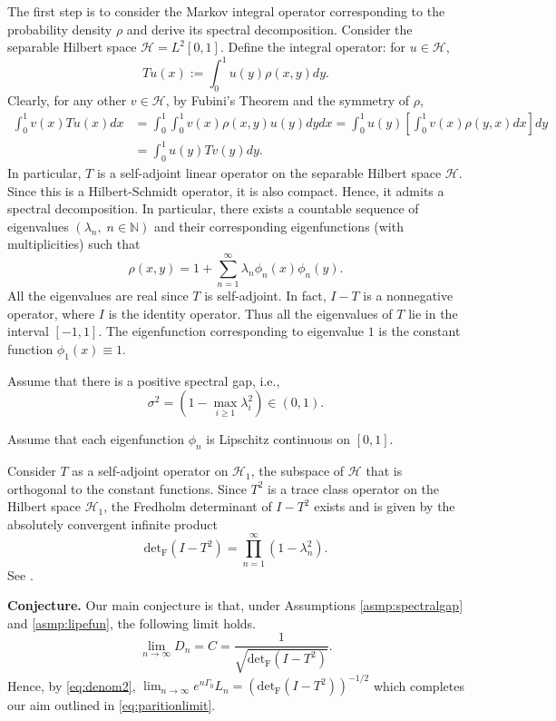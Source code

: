 \documentclass{amsart}
\newcommand{\NN}{\mathbb{N}}
\newcommand{\Hil}{\mathcal{H}}
\newcommand{\Fdet}{\mathrm{det}_{\mathrm{F}}}
\begin{document}
The first step is to consider the Markov integral operator corresponding to the probability density $\rho$ and derive its spectral decomposition. Consider the separable Hilbert space $\Hil=L^2[0,1]$. Define the integral operator: for $u \in \Hil$, 
\[
Tu(x):= \int_0^1 u(y) \rho(x,y)dy.  
\]
Clearly, for any other $v\in \Hil$, by Fubini's Theorem and the symmetry of $\rho$, 
\[
\begin{split}
\int_0^1 v(x) Tu(x) dx &= \int_0^1 \int_0^1 v(x) \rho(x,y) u(y) dy dx= \int_0^1 u(y) \left[ \int_0^1 v(x) \rho(y,x) dx \right] dy\\
&= \int_0^1 u(y) Tv(y) dy. 
\end{split}
\]
In particular, $T$ is a self-adjoint linear operator on the separable Hilbert space $\Hil$. Since this is a Hilbert-Schmidt operator, it is also compact. Hence, it admits a spectral decomposition. In particular, there exists a countable sequence of eigenvalues $(\lambda_n,\; n \in \NN )$ and their corresponding eigenfunctions (with multiplicities) such that 
\[
\rho(x,y) = 1 + \sum_{n=1}^ \infty \lambda_n \phi_n(x)\phi_n(y). 
\]
All the eigenvalues are real since $T$ is self-adjoint. In fact, $I - T$ is a nonnegative operator, where $I$ is the identity operator. Thus all the eigenvalues of $T$ lie in the interval $[-1,1]$. The eigenfunction corresponding to eigenvalue $1$ is the constant function $\phi_1(x) \equiv 1$. 


\begin{asmp}\label{asmp:spectralgap}
Assume that there is a positive spectral gap, i.e., 
\begin{equation}\label{eq:spectralgap}
\sigma^2 = \left(1- \max_{i\ge 1} \lambda^2_i\right) \in (0,1). 
\end{equation}
\end{asmp}

\begin{asmp}\label{asmp:lipefun}
Assume that each eigenfunction $\phi_n$ is Lipschitz continuous on $[0,1]$.
\end{asmp}


Consider $T$ as a self-adjoint operator on $\Hil_1$, the subspace of $\Hil$ that is orthogonal to the constant functions. Since $T^2$ is a trace class operator on the Hilbert space $\Hil_1$, the Fredholm determinant of $I - T^2$ exists and is given by the absolutely convergent infinite product 
\[
\Fdet(I - T^2)= \prod_{n=1}^\infty(1- \lambda^2_n). 
\]
See \cite[Definition 14.35, Theorem 14.44]{van22}.
\medskip

\noindent\textbf{Conjecture.} Our main conjecture is that, under Assumptions \ref{asmp:spectralgap} and \ref{asmp:lipefun}, the following limit holds.
\begin{equation}\label{eq:conjecture}
\lim_{n\rightarrow \infty} D_n = C= \frac{1}{\sqrt{\Fdet(I - T^2)}}. 
\end{equation}
Hence, by \eqref{eq:denom2}, $\lim_{n\rightarrow \infty} e^{n \Gamma_0} L_n= \left(\Fdet(I - T^2)\right)^{-1/2}$ which completes our aim outlined in \eqref{eq:paritionlimit}. 
\end{document}
